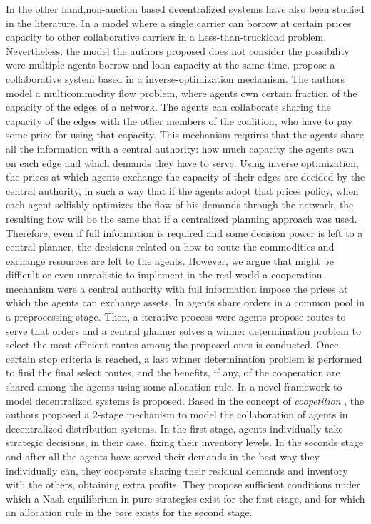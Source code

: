 \documentclass{article}
\begin{document}
In the other hand,non-auction based decentralized systems have also been studied in the literature. In \cite{HERNANDEZ2014} a model where a single carrier can borrow at certain prices capacity to other collaborative carriers in a Less-than-truckload problem. Nevertheless, the model the authors proposed does not consider the possibility were multiple agents borrow and loan capacity at the same time. \cite{AGARWAL2008520}  propose a collaborative system based in a
inverse-optimization mechanism. The authors model a multicommodity flow problem, where agents own certain
fraction of the capacity of the edges of a network. The agents can collaborate sharing the capacity of the edges with the other members of the coalition, who have to pay some price for using that capacity. This mechanism requires that the agents share all the information with a central authority: how much capacity the agents own on each edge and which demands they have to serve.  Using inverse optimization, the prices at which agents exchange the capacity of their edges are decided by the central authority, in such a way that if the agents adopt that prices policy, when each
agent selfishly optimizes the flow of his demands through the network, the resulting flow will be the same that if a centralized planning approach was used. Therefore, even if full information is required and some decision power is left to a central planner, the decisions related on how to route the commodities and exchange resources are left to the agents. However, we argue that might be difficult or even unrealistic to implement in the real world a cooperation mechanism were a central authority with full information impose the prices at which the agents can exchange assets. In \cite{WANG2014} agents share orders in a common pool in a preprocessing stage. Then, a iterative process were agents propose routes to serve that orders and a central planner solves a winner determination problem to select the most efficient routes among the proposed ones is conducted. Once certain stop criteria is reached, a last winner determination problem is performed to find the final select routes, and the benefits, if any, of the cooperation are shared among the agents using some allocation rule.
In \cite{ANUPINDI2001} a novel framework to model decentralized systems is proposed. Based in the concept of \emph{coopetition} \parencite{BRANDENBURGER1996},
the authors proposed a 2-stage mechanism to model the collaboration of agents in
decentralized distribution systems. In the first stage, agents individually
take strategic decisions, in their case, fixing their inventory levels. In the
seconds stage and after all the agents have served their demands in the best way they individually can, they cooperate sharing their residual demands and inventory with the others, obtaining extra profits. They propose sufficient conditions under which a Nash equilibrium in pure strategies exist for the first stage, and for which an allocation rule in the \emph{core} exists for the second stage.
\end{document}

